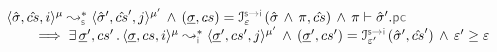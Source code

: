 \begin{lemma}\label{lemma:full:soundiness}
$$
\begin{array}{l} 
\transabssemrule{\sstate, \scs, i}{\sstate', \scs', j}{\mode}{\mode'}{\symbolic} \, \wedge \, 
     (\istate, \cs) = \interpret{\symbinst}{\senv}(\sstate \, \wedge \, \pc, \scs)  \, \wedge \, 
     \pc \vdash \sstate'.\pcsel \\ \quad \quad
     \implies 
        \exists \, \istate', \cs' \, . \, \transabssemrule{\istate, \cs, i}{\istate', \cs', j}{\mode}{\mode'}{\instrumented}
         \, \wedge \, 
            (\istate', \cs') = \interpret{\symbinst}{\senv'}(\sstate', \scs')  \, \wedge \, 
            \senv' \fextends  \senv
 \end{array}
$$
\end{lemma}
